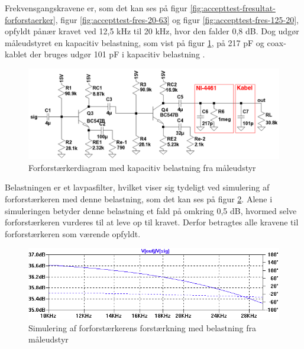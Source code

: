 Frekvensgangskravene er, som det kan ses på figur \ref{fig:accepttest-fresultat-forforstaerker}, figur \ref{fig:accepttest-fres-20-63} og figur \ref{fig:accepttest-fres-125-20}, opfyldt pånær kravet ved 12,5 kHz til 20 kHz, hvor den falder 0,8 dB. Dog udgør måleudstyret en kapacitiv belastning, som vist på figur \ref{fig:cap-error-diagram}, på 217 pF og coax-kablet der bruges udgør 101 pF i kapacitiv belastning \cite{maaling-mm5}.%

\begin{figure}[h]
\centering
\includegraphics[scale=0.35]{teknisk/forforstaerker/cap-error-diagram.png}
\caption{Forforstærkerdiagram med kapacitiv belastning fra måleudstyr}
\label{fig:cap-error-diagram}
\end{figure}

Belastningen er et lavpasfilter, hvilket viser sig tydeligt ved simulering af forforstærkeren med denne belastning, som det kan ses på figur \ref{fig:cap-error}. Alene i simuleringen betyder denne belastning et fald på omkring 0,5 dB, hvormed selve forforstærkeren vurderes til at leve op til kravet. Derfor betragtes alle kravene til forforstærkeren som værende opfyldt.

\begin{figure}[h]
\centering
\includegraphics[width=\textwidth]{teknisk/forforstaerker/cap-error.png}
\caption{Simulering af forforstærkerens forstærkning med belastning fra måleudstyr}
\label{fig:cap-error}
\end{figure}